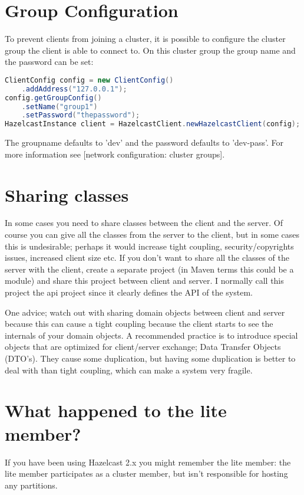 \section{Group Configuration}
To prevent clients from joining a cluster, it is possible to configure the cluster group the client is able to connect to. On this cluster group the group name and the password can be set:
\begin{lstlisting}[language=java]
ClientConfig config = new ClientConfig()
    .addAddress("127.0.0.1");
config.getGroupConfig()
    .setName("group1")
    .setPassword("thepassword");
HazelcastInstance client = HazelcastClient.newHazelcastClient(config);
\end{lstlisting}
The groupname defaults to 'dev' and the password defaults to 'dev-pass'. For more information see [network configuration: cluster groups].

\section{Sharing classes}
In some cases you need to share classes between the client and the server. Of course you can give all the classes from the server to the client, but in some cases this is undesirable; perhaps it would increase tight coupling, security/copyrights issues, increased client size etc. If you don't want to share all the classes of the server with the client, create a separate project (in Maven terms this could be a module) and share this project between client and server. I normally call this project the api project since it clearly defines the API of the system. 

One advice; watch out with sharing domain objects between client and server because this can cause a tight coupling because the client starts to see the internals of your domain objects. A recommended practice is to introduce special objects that are optimized for client/server exchange; Data Transfer Objects (DTO's). They cause some duplication, but having some duplication is better to deal with than tight coupling, which can make a system very fragile.

\section{What happened to the lite member?}
If you have been using Hazelcast 2.x you might remember the lite member: the lite member participates as a cluster member, but isn't responsible for hosting any partitions. 

